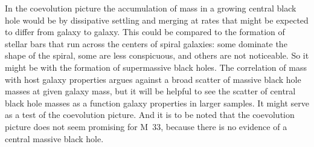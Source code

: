 \documentclass[fleqn,usenatbib]{mnras}
\begin{document}
In the coevolution picture the accumulation of mass in a growing central black hole would be by dissipative settling and merging at rates that might be expected to differ from galaxy to galaxy. This could be compared to the formation of stellar bars that run across the centers of spiral galaxies: some dominate the shape of the spiral, some are less conspicuous, and others are not noticeable. So it might be with the formation of supermassive black holes. The correlation of  mass with host galaxy properties argues against a broad scatter of massive black hole masses at given galaxy mass, but it will be helpful to see the scatter of central black hole masses as a function galaxy properties in larger samples. It might serve as a test of the coevolution picture. And it is to be noted that the coevolution picture does not seem promising for M~33, because there is no evidence of a central massive black hole.

\end{document}
